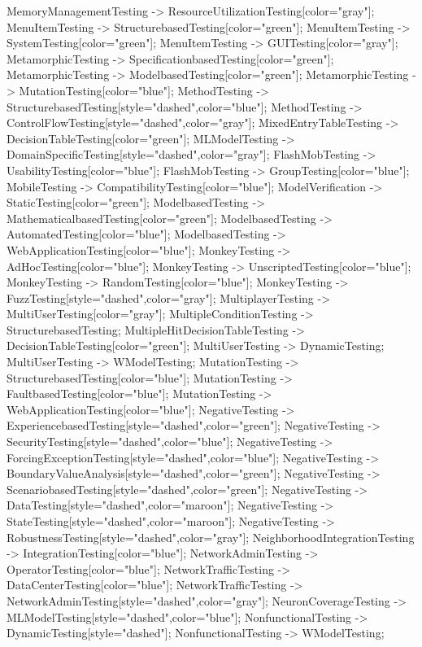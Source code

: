 \documentclass{article}
\begin{document}
{MemoryManagementTesting -> ResourceUtilizationTesting[color="gray"];
MenuItemTesting -> StructurebasedTesting[color="green"];
MenuItemTesting -> SystemTesting[color="green"];
MenuItemTesting -> GUITesting[color="gray"];
MetamorphicTesting -> SpecificationbasedTesting[color="green"];
MetamorphicTesting -> ModelbasedTesting[color="green"];
MetamorphicTesting -> MutationTesting[color="blue"];
MethodTesting -> StructurebasedTesting[style="dashed",color="blue"];
MethodTesting -> ControlFlowTesting[style="dashed",color="gray"];
MixedEntryTableTesting -> DecisionTableTesting[color="green"];
MLModelTesting -> DomainSpecificTesting[style="dashed",color="gray"];
FlashMobTesting -> UsabilityTesting[color="blue"];
FlashMobTesting -> GroupTesting[color="blue"];
MobileTesting -> CompatibilityTesting[color="blue"];
ModelVerification -> StaticTesting[color="green"];
ModelbasedTesting -> MathematicalbasedTesting[color="green"];
ModelbasedTesting -> AutomatedTesting[color="blue"];
ModelbasedTesting -> WebApplicationTesting[color="blue"];
MonkeyTesting -> AdHocTesting[color="blue"];
MonkeyTesting -> UnscriptedTesting[color="blue"];
MonkeyTesting -> RandomTesting[color="blue"];
MonkeyTesting -> FuzzTesting[style="dashed",color="gray"];
MultiplayerTesting -> MultiUserTesting[color="gray"];
MultipleConditionTesting -> StructurebasedTesting;
MultipleHitDecisionTableTesting -> DecisionTableTesting[color="green"];
MultiUserTesting -> DynamicTesting;
MultiUserTesting -> WModelTesting;
MutationTesting -> StructurebasedTesting[color="blue"];
MutationTesting -> FaultbasedTesting[color="blue"];
MutationTesting -> WebApplicationTesting[color="blue"];
NegativeTesting -> ExperiencebasedTesting[style="dashed",color="green"];
NegativeTesting -> SecurityTesting[style="dashed",color="blue"];
NegativeTesting -> ForcingExceptionTesting[style="dashed",color="blue"];
NegativeTesting -> BoundaryValueAnalysis[style="dashed",color="green"];
NegativeTesting -> ScenariobasedTesting[style="dashed",color="green"];
NegativeTesting -> DataTesting[style="dashed",color="maroon"];
NegativeTesting -> StateTesting[style="dashed",color="maroon"];
NegativeTesting -> RobustnessTesting[style="dashed",color="gray"];
NeighborhoodIntegrationTesting -> IntegrationTesting[color="blue"];
NetworkAdminTesting -> OperatorTesting[color="blue"];
NetworkTrafficTesting -> DataCenterTesting[color="blue"];
NetworkTrafficTesting -> NetworkAdminTesting[style="dashed",color="gray"];
NeuronCoverageTesting -> MLModelTesting[style="dashed",color="blue"];
NonfunctionalTesting -> DynamicTesting[style="dashed"];
NonfunctionalTesting -> WModelTesting;
}
\end{document}
